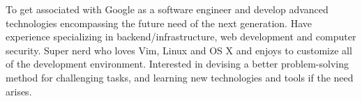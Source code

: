 

\begin{cvparagraph}

To get associated with Google as a software engineer and develop advanced technologies encompassing the future need of the next generation. Have experience specializing in backend/infrastructure, web development and computer security. Super nerd who loves Vim, Linux and OS X and enjoys to customize all of the development environment. Interested in devising a better problem-solving method for challenging tasks, and learning new technologies and tools if the need arises.
\end{cvparagraph}
